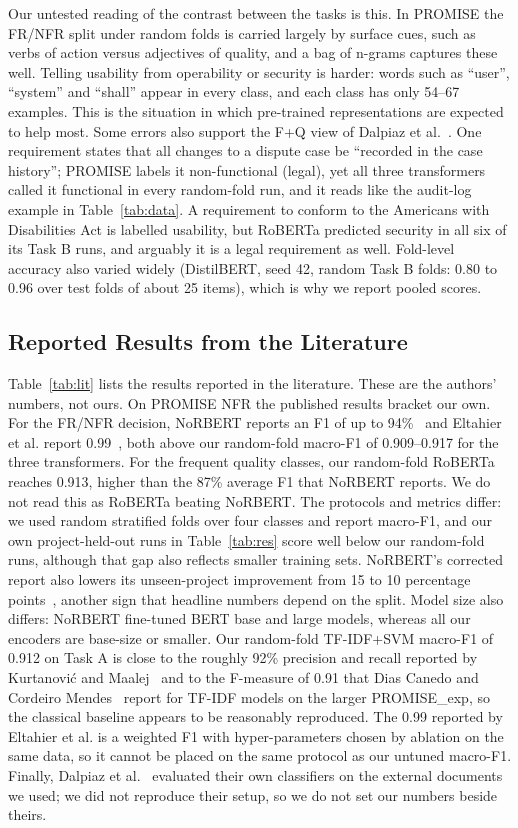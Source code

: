 \documentclass[conference,10pt,letterpaper]{IEEEtran}
\begin{document}
Our untested reading of the contrast between the tasks is this. In PROMISE the FR/NFR split under random folds is carried largely by surface cues, such as verbs of action versus adjectives of quality, and a bag of n-grams captures these well. Telling usability from operability or security is harder: words such as “user”, “system” and “shall” appear in every class, and each class has only 54–67 examples. This is the situation in which pre-trained representations are expected to help most. Some errors also support the F+Q view of Dalpiaz et al.~\cite{dalpiaz2019}. One requirement states that all changes to a dispute case be “recorded in the case history”; PROMISE labels it non-functional (legal), yet all three transformers called it functional in every random-fold run, and it reads like the audit-log example in Table~\ref{tab:data}. A requirement to conform to the Americans with Disabilities Act is labelled usability, but RoBERTa predicted security in all six of its Task B runs, and arguably it is a legal requirement as well. Fold-level accuracy also varied widely (DistilBERT, seed 42, random Task B folds: 0.80 to 0.96 over test folds of about 25 items), which is why we report pooled scores.

\subsection{Reported Results from the Literature}\label{sec:litres}
Table~\ref{tab:lit} lists the results reported in the literature. These are the authors' numbers, not ours. On PROMISE NFR the published results bracket our own. For the FR/NFR decision, NoRBERT reports an F1 of up to 94\%~\cite{hey2020norbert} and Eltahier et al. report 0.99~\cite{eltahier2025}, both above our random-fold macro-F1 of 0.909–0.917 for the three transformers. For the frequent quality classes, our random-fold RoBERTa reaches 0.913, higher than the 87\% average F1 that NoRBERT reports. We do not read this as RoBERTa beating NoRBERT. The protocols and metrics differ: we used random stratified folds over four classes and report macro-F1, and our own project-held-out runs in Table~\ref{tab:res} score well below our random-fold runs, although that gap also reflects smaller training sets. NoRBERT's corrected report also lowers its unseen-project improvement from 15 to 10 percentage points~\cite{hey2022corrected}, another sign that headline numbers depend on the split. Model size also differs: NoRBERT fine-tuned BERT base and large models, whereas all our encoders are base-size or smaller. Our random-fold TF-IDF+SVM macro-F1 of 0.912 on Task A is close to the roughly 92\% precision and recall reported by Kurtanović and Maalej~\cite{kurtanovic2017} and to the F-measure of 0.91 that Dias Canedo and Cordeiro Mendes~\cite{diascanedo2020} report for TF-IDF models on the larger PROMISE\_exp, so the classical baseline appears to be reasonably reproduced. The 0.99 reported by Eltahier et al. is a weighted F1 with hyper-parameters chosen by ablation on the same data, so it cannot be placed on the same protocol as our untuned macro-F1. Finally, Dalpiaz et al.~\cite{dalpiaz2019} evaluated their own classifiers on the external documents we used; we did not reproduce their setup, so we do not set our numbers beside theirs.
\end{document}
